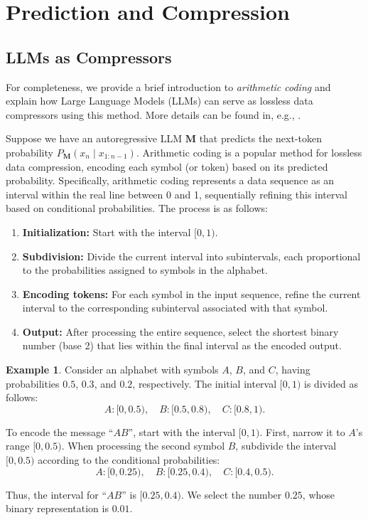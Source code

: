 \documentclass[11pt]{article}
\theoremstyle{plain}
\theoremstyle{definition}
\newtheorem{example}[theorem]{Example}
\newcommand{\llm}{\boldsymbol{M}}
\begin{document}




\newpage
\appendix
\onecolumn

\section{Prediction and Compression}
\label{app:prediction_compression}


\subsection{LLMs as Compressors}
\label{app:llmcompressor}


For completeness, we provide a brief introduction to 
{\em arithmetic coding} and explain how Large Language Models (LLMs) can serve as lossless data compressors using this method. More details can be found in, e.g., \citep{rissanen1976generalized, cover2006elements, deletanglanguage,li2025lossless}.

Suppose we have an autoregressive LLM $\llm$ that predicts the next-token probability \(P_{\llm}(x_n \mid x_{1:n-1})\). Arithmetic coding is a popular method for lossless data compression, encoding each symbol (or token) based on its predicted probability. Specifically, arithmetic coding represents a data sequence as an interval within the real line between 0 and 1, sequentially refining this interval based on conditional probabilities. The process is as follows:

\begin{enumerate}
\item \textbf{Initialization:} Start with the interval \([0, 1)\).
\item \textbf{Subdivision:} Divide the current interval into subintervals, each proportional to the probabilities assigned to symbols in the alphabet.
\item \textbf{Encoding tokens:} For each symbol in the input sequence, refine the current interval to the corresponding subinterval associated with that symbol.
\item \textbf{Output:} After processing the entire sequence, select the shortest binary number (base 2) that lies within the final interval as the encoded output.
\end{enumerate}

\begin{example}
Consider an alphabet with symbols \(A\), \(B\), and \(C\), having probabilities \(0.5\), \(0.3\), and \(0.2\), respectively. The initial interval \([0, 1)\) is divided as follows:
\[
A: [0, 0.5),\quad B: [0.5, 0.8),\quad C: [0.8, 1).
\]

To encode the message ``\(AB\)'', start with the interval \([0, 1)\). First, narrow it to \(A\)'s range \([0, 0.5)\). When processing the second symbol \(B\), subdivide the interval \([0, 0.5)\) according to the conditional probabilities:
\[
A: [0, 0.25),\quad B: [0.25, 0.4),\quad C: [0.4, 0.5).
\]

Thus, the interval for ``\(AB\)'' is \([0.25, 0.4)\). We select the number \(0.25\), whose binary representation is \(0.01\).
\end{example}
\end{document}
